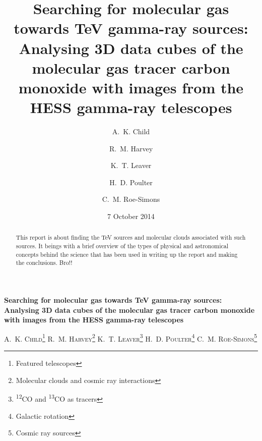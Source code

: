 \documentclass[a4paper, titlepage, oneside]{article}
\newcommand{\elem}[2]{\textsuperscript{#1}{#2}}
\begin{document}
\title{\textbf{Searching for molecular gas towards TeV gamma-ray sources: Analysing 3D data cubes of the molecular gas tracer carbon monoxide with images from the HESS gamma-ray telescopes}}
\author{A.~K. Child \and R.~M. Harvey \and K.~T. Leaver \and H.~D. Poulter \and C.~M. Roe-Simons}
\date{7 October 2014} %
\maketitle

\setcounter{page}{1}

\tableofcontents

\clearpage
\setcounter{page}{1}

\begin{center}
  {\large \textbf{Searching for molecular gas towards TeV gamma-ray sources: Analysing 3D data cubes of the molecular gas tracer carbon monoxide with images from the HESS gamma-ray telescopes}}

  \vspace{1.5em}

  \textsc{A.~K. Child\footnote{Featured telescopes} \quad R.~M. Harvey\footnote{Molecular clouds and cosmic ray interactions} \quad K.~T. Leaver\footnote{\elem{12}{CO} and \elem{13}{CO} as tracers} \quad H.~D. Poulter\footnote{Galactic rotation} \quad C.~M. Roe-Simons\footnote{Cosmic ray sources}}
\end{center}

\vspace{1.5em}

\begin{minipage}{0.93\textwidth}
  \begin{abstract}
  This report is about finding the TeV sources and molecular clouds associated with such sources. It beings with a brief overview of the types of physical and astronomical concepts behind the science that has been used in writing up the report and making the conclusions. Bro!!
  \end{abstract}
\end{minipage}

\vspace{1em} %
\end{document}
